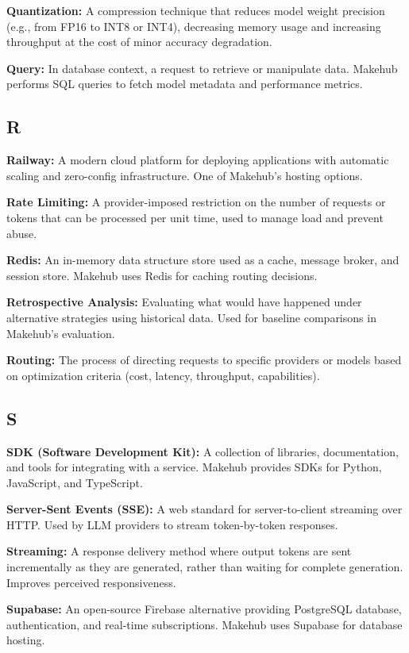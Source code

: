 \documentclass[english]{article}
\begin{document}
\textbf{Quantization:} A compression technique that reduces model weight precision (e.g., from FP16 to INT8 or INT4), decreasing memory usage and increasing throughput at the cost of minor accuracy degradation.

\textbf{Query:} In database context, a request to retrieve or manipulate data. Makehub performs SQL queries to fetch model metadata and performance metrics.

\subsection*{R}

\textbf{Railway:} A modern cloud platform for deploying applications with automatic scaling and zero-config infrastructure. One of Makehub's hosting options.

\textbf{Rate Limiting:} A provider-imposed restriction on the number of requests or tokens that can be processed per unit time, used to manage load and prevent abuse.

\textbf{Redis:} An in-memory data structure store used as a cache, message broker, and session store. Makehub uses Redis for caching routing decisions.

\textbf{Retrospective Analysis:} Evaluating what would have happened under alternative strategies using historical data. Used for baseline comparisons in Makehub's evaluation.

\textbf{Routing:} The process of directing requests to specific providers or models based on optimization criteria (cost, latency, throughput, capabilities).

\subsection*{S}

\textbf{SDK (Software Development Kit):} A collection of libraries, documentation, and tools for integrating with a service. Makehub provides SDKs for Python, JavaScript, and TypeScript.

\textbf{Server-Sent Events (SSE):} A web standard for server-to-client streaming over HTTP. Used by LLM providers to stream token-by-token responses.

\textbf{Streaming:} A response delivery method where output tokens are sent incrementally as they are generated, rather than waiting for complete generation. Improves perceived responsiveness.

\textbf{Supabase:} An open-source Firebase alternative providing PostgreSQL database, authentication, and real-time subscriptions. Makehub uses Supabase for database hosting.
\end{document}
